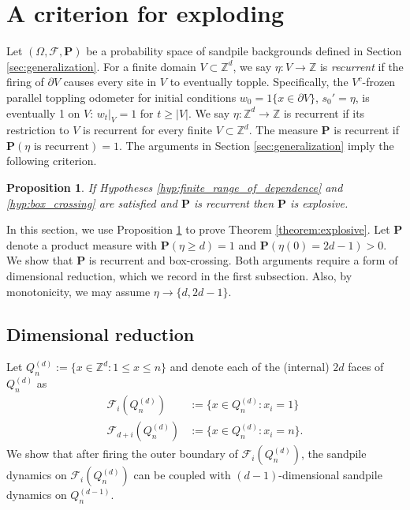 \documentclass[aap]{imsart}
\newcommand{\Z}{\mathbb{Z}}
\newtheorem{prop}{Proposition}[section]
\begin{document}
\section{A criterion for exploding} \label{sec:criteria}

Let $(\Omega, \mathcal{F}, \mathbf{P})$ be a probability space of sandpile backgrounds defined in Section \ref{sec:generalization}. 
For a finite domain $V \subset \Z^d$, we say  $\eta: V \to \Z$ is {\it recurrent} if the firing of $\partial V$ causes every site in $V$ to eventually topple. 
Specifically, the $V^c$-frozen parallel toppling odometer for initial conditions $w_0 = 1\{ x \in \partial V\}$, $s_0' = \eta$, 
is eventually 1 on $V$: $w_t |_{V} = 1$ for $t \geq |V|$. We say $\eta: \Z^d \to \Z$ is recurrent if its
restriction to $V$ is recurrent for every finite $V \subset \Z^d$.  The measure $\mathbf{P}$ is recurrent if $\mathbf{P}(\mbox{$\eta$ is recurrent}) = 1$. The arguments in Section \ref{sec:generalization} imply the following criterion. 

\begin{prop} \label{prop:explosion_criteria}
	If Hypotheses \ref{hyp:finite_range_of_dependence} and \ref{hyp:box_crossing} 
	are satisfied and $\mathbf{P}$ is recurrent
	then $\mathbf{P}$ is explosive. 
\end{prop}

In this section, we use Proposition \ref{prop:explosion_criteria} to prove Theorem \ref{theorem:explosive}.
Let $\mathbf{P}$ denote a product measure with $\mathbf{P}(\eta \geq d) = 1$ and $\mathbf{P}(\eta(0) = 2 d -1) > 0$. 
We show that $\mathbf{P}$ is recurrent and box-crossing. 
Both arguments require a form of dimensional reduction, which we record in the first subsection.
Also, by monotonicity, we may assume $\eta \to \{d, 2 d - 1\}$. 



\subsection{Dimensional reduction}
Let $Q_n^{(d)} := \{ x \in \Z^d : 1 \leq x \leq n\}$ and denote each of the (internal) $2d$ faces of $Q_n^{(d)}$ as 
\begin{equation}\label{eq:faces_definition}
\begin{aligned}
\mathcal{F}_i(Q_n^{(d)}) &:= \{ x \in Q_n^{(d)} : x_i = 1\} \\
\mathcal{F}_{d+i}(Q_n^{(d)}) &:= \{ x \in Q_n^{(d)} : x_i = n\}.
\end{aligned}
\end{equation}
We show that after firing the outer boundary of $\mathcal{F}_i(Q_n^{(d)})$, 
the sandpile dynamics on $\mathcal{F}_i(Q_n^{(d)})$ can be coupled
with $(d-1)$-dimensional sandpile dynamics on $Q_n^{(d-1)}$.
\end{document}
